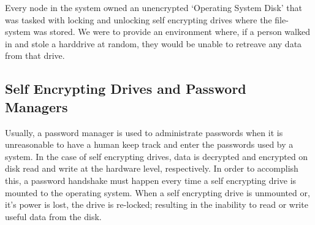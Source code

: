 \documentclass[11pt]{article} %
\def\pm{password manager\xspace}
\def\sed{self encrypting drive\xspace}
\def\seds{\sed{s}\xspace}
\begin{document}
\begin{center}
\end{center}

Every node in the system owned an unencrypted `Operating System Disk' that was tasked with locking and unlocking \seds where the file-system was stored. We were to provide an environment where, if a person walked in and stole a harddrive at random, they would be unable to retreave any data from that drive.

\subsection*{Self Encrypting Drives and Password Managers}

Usually, a \pm is used to administrate passwords when it is unreasonable to have a human keep track and enter the passwords used by a system. In the case of \seds, data is decrypted and encrypted on disk read and write at the hardware level, respectively. In order to accomplish this, a password handshake must happen every time a \sed is mounted to the operating system. When a \sed is unmounted or, it's power is lost, the drive is re-locked; resulting in the inability to read or write useful data from the disk.
\end{document}
